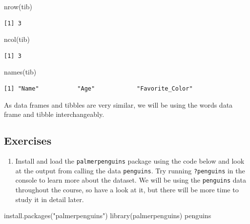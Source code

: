 \documentclass[
  letterpaper,
  DIV=11,
  numbers=noendperiod]{scrreprt}
\newenvironment{Shaded}{\begin{snugshade}}{\end{snugshade}}
\newcommand{\FunctionTok}[1]{\textcolor[rgb]{0.28,0.35,0.67}{#1}}
\newcommand{\NormalTok}[1]{\textcolor[rgb]{0.00,0.23,0.31}{#1}}
\newcommand{\StringTok}[1]{\textcolor[rgb]{0.13,0.47,0.30}{#1}}
\providecommand{\tightlist}{%
  \setlength{\itemsep}{0pt}\setlength{\parskip}{0pt}}\usepackage{longtable,booktabs,array}
\begin{document}
\begin{Shaded}
\begin{Highlighting}[]
\FunctionTok{nrow}\NormalTok{(tib)}
\end{Highlighting}
\end{Shaded}

\begin{verbatim}
[1] 3
\end{verbatim}

\begin{Shaded}
\begin{Highlighting}[]
\FunctionTok{ncol}\NormalTok{(tib)}
\end{Highlighting}
\end{Shaded}

\begin{verbatim}
[1] 3
\end{verbatim}

\begin{Shaded}
\begin{Highlighting}[]
\FunctionTok{names}\NormalTok{(tib)}
\end{Highlighting}
\end{Shaded}

\begin{verbatim}
[1] "Name"           "Age"            "Favorite_Color"
\end{verbatim}

As data frames and tibbles are very similar, we will be using the words
data frame and tibble interchangeably.

\subsection{Exercises}\label{exercises-4}

\begin{enumerate}
\def\labelenumi{\arabic{enumi}.}
\tightlist
\item
  Install and load the \texttt{palmerpenguins} package using the code
  below and look at the output from calling the data \texttt{penguins}.
  Try running \texttt{?penguins} in the console to learn more about the
  dataset. We will be using the \texttt{penguins} data throughout the
  course, so have a look at it, but there will be more time to study it
  in detail later.
\end{enumerate}

\begin{Shaded}
\begin{Highlighting}[]
\FunctionTok{install.packages}\NormalTok{(}\StringTok{"palmerpenguins"}\NormalTok{)}
\FunctionTok{library}\NormalTok{(palmerpenguins)}
\NormalTok{penguins}
\end{Highlighting}
\end{Shaded}
\end{document}
